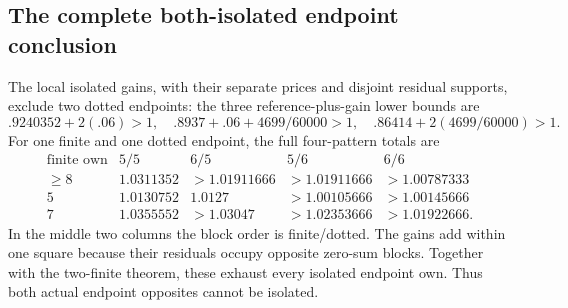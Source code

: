 \subsection{The complete both-isolated endpoint conclusion}
The local isolated gains, with their separate
prices and disjoint residual supports, exclude
two dotted endpoints:
the three reference-plus-gain lower bounds are
\[
 .9240352+2(.06)>1,\quad
 .8937+.06+4699/60000>1,\quad
 .86414+2(4699/60000)>1.
\]
For one finite and one dotted endpoint, the
full four-pattern totals are
\[
\begin{array}{c|c|c|c|c}
\text{finite own}&5/5&6/5&5/6&6/6\\ \hline
\geq8&1.0311352&>1.01911666&>1.01911666&>1.00787333\\
5&1.0130752&1.0127&>1.00105666&>1.00145666\\
7&1.0355552&>1.03047&>1.02353666&>1.01922666.
\end{array}
\]
In the middle two columns the block order
is finite/dotted. The gains add within
one square because their residuals occupy
opposite zero-sum blocks.
Together with the two-finite theorem,
these exhaust every isolated endpoint own.
Thus both actual endpoint opposites cannot
be isolated.




